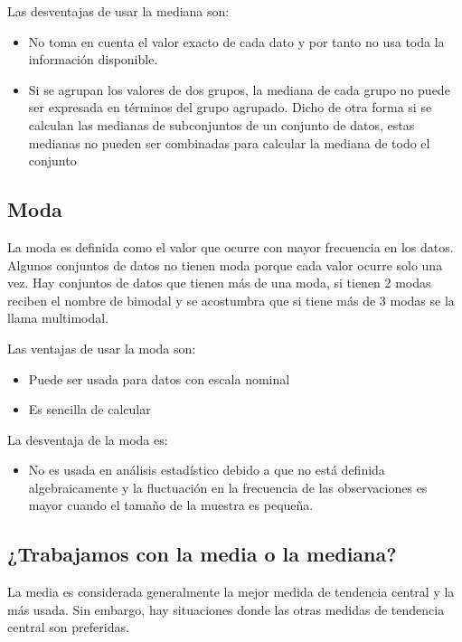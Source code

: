 \documentclass[letterpaper,]{book}
\providecommand{\tightlist}{%
  \setlength{\itemsep}{0pt}\setlength{\parskip}{0pt}}
\begin{document}
Las desventajas de usar la mediana son:

\begin{itemize}
\tightlist
\item
  No toma en cuenta el valor exacto de cada dato y por tanto no usa toda la información disponible.
\item
  Si se agrupan los valores de dos grupos, la mediana de cada grupo no puede ser expresada en términos del grupo agrupado. Dicho de otra forma si se calculan las medianas de subconjuntos de un conjunto de datos, estas medianas no pueden ser combinadas para calcular la mediana de todo el conjunto
\end{itemize}

\hypertarget{moda}{%
\subsection{Moda}\label{moda}}

La moda es definida como el valor que ocurre con mayor frecuencia en los datos. Algunos conjuntos de datos no tienen moda porque cada valor ocurre solo una vez. Hay conjuntos de datos que tienen más de una moda, si tienen 2 modas reciben el nombre de bimodal y se acostumbra que si tiene más de 3 modas se la llama multimodal.

Las ventajas de usar la moda son:

\begin{itemize}
\tightlist
\item
  Puede ser usada para datos con escala nominal
\item
  Es sencilla de calcular
\end{itemize}

La desventaja de la moda es:

\begin{itemize}
\tightlist
\item
  No es usada en análisis estadístico debido a que no está definida algebraicamente y la fluctuación en la frecuencia de las observaciones es mayor cuando el tamaño de la muestra es pequeña.
\end{itemize}

\hypertarget{trabajamos-con-la-media-o-la-mediana}{%
\subsection{¿Trabajamos con la media o la mediana?}\label{trabajamos-con-la-media-o-la-mediana}}

La media es considerada generalmente la mejor medida de tendencia central y la más usada. Sin embargo, hay situaciones donde las otras medidas de tendencia central son preferidas.
\end{document}
